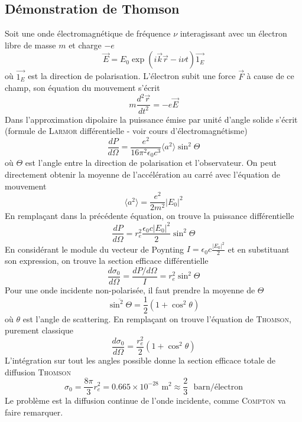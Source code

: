\subsection{Démonstration de Thomson}
Soit une onde électromagnétique de fréquence $\nu$ interagissant avec un électron libre de 
masse $m$ et charge $-e$
\begin{equation}
\overrightarrow{E}=E_0\exp{(i\overrightarrow{k}\overrightarrow{r}-i\nu t)}\overrightarrow{1_E}
\end{equation}
où $\vec{1_E}$ est la direction de polarisation. L'électron subit une force $\vec{F}$ à cause
de ce champ, son équation du mouvement s'écrit
\begin{equation}
m\frac{d^2\overrightarrow{r}}{dt^2}=-e\overrightarrow{E}
\end{equation}
Dans l'approximation dipolaire la puissance émise par unité d'angle solide s'écrit (formule 
de \textsc{Larmor} différentielle - voir cours d'électromagnétisme) 
\begin{equation}
\frac{dP}{d\Omega}=\frac{e^2}{16\pi^2\epsilon_0c^3}\langle a^2 \rangle \sin^2\Theta
\end{equation}
où $\Theta$ est l'angle entre la direction de polarisation et l'observateur. On peut directement
obtenir la moyenne de l'accélération au carré avec l'équation de mouvement
\begin{equation}
\langle a^2 \rangle=\frac{e^2}{2m^2}|E_0|^2
\end{equation}
En remplaçant dans la précédente équation, on trouve la puissance différentielle
\begin{equation}
\frac{dP}{d\Omega}=r_e^2 \frac{\epsilon_0c|E_0|^2}{2}\sin^2\Theta
\end{equation}
En considérant le module du vecteur de Poynting $I=\epsilon_0c\frac{|E_0|^2}{2}$ et en substituant
son expression, on trouve la section efficace différentielle
\begin{equation}
\frac{d\sigma_0}{d\Omega}=\frac{dP/d\Omega}{I}=r_e^2\sin^2\Theta
\end{equation}
Pour une onde incidente non-polarisée, il faut prendre la moyenne de $\Theta$
\begin{equation}
\overline{\sin^2\Theta}=\frac{1}{2}(1+\cos^2\theta)
\end{equation}
où $\theta$ est l'angle de scattering. En remplaçant on trouve l'équation de \textsc{Thomson}, 
purement classique
\begin{equation}
\frac{d\sigma_0}{d\Omega}=\frac{r_e^2}{2}(1+\cos^2\theta)
\end{equation}
L'intégration sur tout les angles possible donne la section efficace totale de diffusion
\textsc{Thomson}
\begin{equation}
\sigma_0=\frac{8\pi}{3}r_e^2=0.665\times 10^{-28} \mbox{~m}^2 \approx \frac{2}{3} \mbox{~~barn/\'electron}
\end{equation}
Le problème est la diffusion continue de l'onde incidente, comme \textsc{Compton} va faire remarquer.

